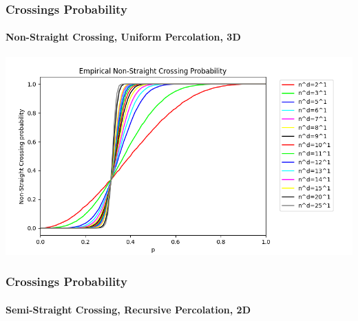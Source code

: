 \documentclass{beamer}
\begin{document}
	\begin{frame}
		\frametitle{Crossings Probability}
		\framesubtitle{Non-Straight Crossing, Uniform Percolation, 3D}
		\includegraphics[scale=0.5]{imgs/crossing_proba_3D_bis.png}
	\end{frame}
	\begin{frame}
		\frametitle{Crossings Probability}
		\framesubtitle{Semi-Straight Crossing, Recursive Percolation, 2D}
	\end{frame}
\end{document}

